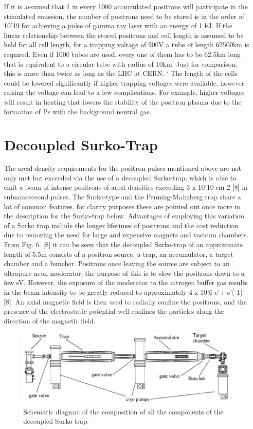 If it is assumed that 1 in every 1000 accumulated positrons will participate in the stimulated emission, the number of positrons need to be stored is in the order of 10'19 for achieving a pulse of gamma ray laser with an energy of 1 kJ. If the linear relationship between the stored positrons and cell length is assumed to be held for all cell length, for a trapping voltage of 900V a tube of length 62500km is required. Even if 1000 tubes are used, every one of them has to be 62.5km long that is equivalent to a circular tube with radius of 10km. Just for comparison, this is more than twice as long as the LHC at CERN. 
`	The length of the cells could be lowered significantly if higher trapping voltages were available, however raising the voltage can lead to a few complications. For example, higher voltages will result in heating that lowers the stability of the positron plasma due to the formation of Ps with the background neutral gas. 


\section{Decoupled Surko-Trap}

The areal density requirements for the positron pulses mentioned above are not only met but exceeded via the use of a decoupled Surko-trap, which is able to emit a beam of intense positrons of areal densities exceeding 3 x 10'10 cm-2   [8] in subnanosecond pulses. The Surko-type and the Penning-Malmberg trap share a lot of common features, for clarity purposes these are pointed out once more in the description for the Surko-trap below. Advantages of employing this variation of a Surko trap include the longer lifetimes of positrons and the cost reduction due to removing the need for large and expensive magnets and vacuum chambers.
From Fig. 6. [8] it can be seen that the decoupled Surko-trap of an approximate length of 5.5m consists of a positron source, a trap, an accumulator, a target chamber and a buncher. Positrons once leaving the source are subject to an ultrapure neon moderator, the purpose of this is to slow the positrons down to a few eV. However, the exposure of the moderator to the nitrogen buffer gas results in the beam intensity to be greatly reduced to approximately 4 x 10'6 e'+ s'(-1)  [8]. An axial magnetic field is then used to radially confine the positrons, and the presence of the electrostatic potential well confines the particles along the direction of the magnetic field.

\begin{figure}[h]
\centering
\includegraphics{Figures/C2F6}
\decoRule
\caption[C2F6]{Schematic diagram of the composition of all the components of the decoupled Surko-trap.}
\label{fig:C2F6}
\end{figure}

